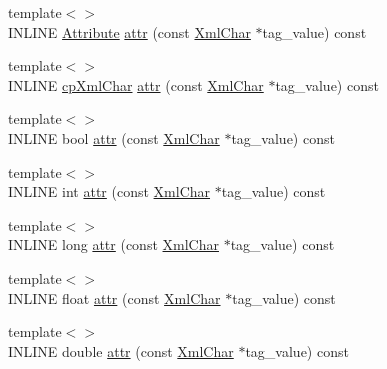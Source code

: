 \begin{DoxyCompactItemize}
{\footnotesize template$<$$>$ }\\INLINE \hyperlink{namespace_d_d4hep_1_1_x_m_l_a5c19b7116be99d69b4b22d911357baaf}{Attribute} \hyperlink{class_d_d4hep_1_1_x_m_l_1_1_handle__t_a4c022784fbe30031ef263dd5f2b3b069}{attr} (const \hyperlink{namespace_d_d4hep_1_1_x_m_l_a09e5d9cc86ed782f6826dfe0778c1815}{XmlChar} $\ast$tag\_\-value) const 
\item 
{\footnotesize template$<$$>$ }\\INLINE \hyperlink{namespace_d_d4hep_1_1_x_m_l_a55d8459973c11d7c20ba5a1d7ef1242c}{cpXmlChar} \hyperlink{class_d_d4hep_1_1_x_m_l_1_1_handle__t_a8a9db77ecaf5aabaae482bc35a313115}{attr} (const \hyperlink{namespace_d_d4hep_1_1_x_m_l_a09e5d9cc86ed782f6826dfe0778c1815}{XmlChar} $\ast$tag\_\-value) const 
\item 
{\footnotesize template$<$$>$ }\\INLINE bool \hyperlink{class_d_d4hep_1_1_x_m_l_1_1_handle__t_a02dfeae7ede51d6050f15e9ad68bd72a}{attr} (const \hyperlink{namespace_d_d4hep_1_1_x_m_l_a09e5d9cc86ed782f6826dfe0778c1815}{XmlChar} $\ast$tag\_\-value) const 
\item 
{\footnotesize template$<$$>$ }\\INLINE int \hyperlink{class_d_d4hep_1_1_x_m_l_1_1_handle__t_a7a07d45494000e6a516adba15fb377ee}{attr} (const \hyperlink{namespace_d_d4hep_1_1_x_m_l_a09e5d9cc86ed782f6826dfe0778c1815}{XmlChar} $\ast$tag\_\-value) const 
\item 
{\footnotesize template$<$$>$ }\\INLINE long \hyperlink{class_d_d4hep_1_1_x_m_l_1_1_handle__t_a44872ce20d4d455c3a223f8c5ea35837}{attr} (const \hyperlink{namespace_d_d4hep_1_1_x_m_l_a09e5d9cc86ed782f6826dfe0778c1815}{XmlChar} $\ast$tag\_\-value) const 
\item 
{\footnotesize template$<$$>$ }\\INLINE float \hyperlink{class_d_d4hep_1_1_x_m_l_1_1_handle__t_a7188282811aaefbdc1d455f4002ab1f6}{attr} (const \hyperlink{namespace_d_d4hep_1_1_x_m_l_a09e5d9cc86ed782f6826dfe0778c1815}{XmlChar} $\ast$tag\_\-value) const 
\item 
{\footnotesize template$<$$>$ }\\INLINE double \hyperlink{class_d_d4hep_1_1_x_m_l_1_1_handle__t_af98ad78cd6aa7e536de9ddbf42d1fb46}{attr} (const \hyperlink{namespace_d_d4hep_1_1_x_m_l_a09e5d9cc86ed782f6826dfe0778c1815}{XmlChar} $\ast$tag\_\-value) const 
\end{DoxyCompactItemize}
